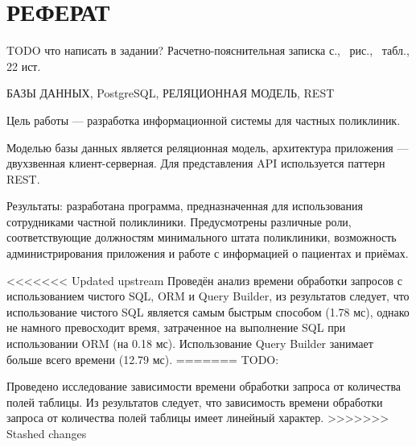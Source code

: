 \section*{\large РЕФЕРАТ}

TODO что написать в задании?
Расчетно-пояснительная записка \pageref{LastPage} с., \totalfigures\ рис., \totaltables\ табл., 22 ист.

БАЗЫ ДАННЫХ, PostgreSQL, РЕЛЯЦИОННАЯ МОДЕЛЬ, REST


Цель работы --- разработка информационной системы для частных поликлиник.

Моделью базы данных является реляционная модель, архитектура приложения --- двухзвенная клиент-серверная.
Для представления API используется паттерн REST.

Результаты: разработана программа, предназначенная для использования сотрудниками частной поликлиники. Предусмотрены различные роли, соответствующие должностям минимального штата поликлиники, возможность администрирования приложения и работе с информацией о пациентах и приёмах.

<<<<<<< Updated upstream
Проведён анализ времени обработки запросов с использованием чистого SQL, ORM и Query Builder, из результатов следует, что использование чистого SQL является самым быстрым способом (1.78 мс), однако не намного превосходит время, затраченное на выполнение SQL при использовании ORM (на 0.18 мс). Использование Query Builder занимает больше всего времени (12.79 мс).
=======
TODO:

Проведено исследование зависимости времени обработки запроса от количества полей таблицы.
Из результатов следует, что зависимость времени обработки запроса от количества полей таблицы имеет линейный характер.
>>>>>>> Stashed changes

\pagebreak